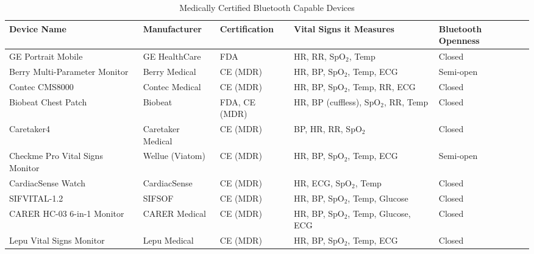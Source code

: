 \begin{table}[H]
\centering
\caption{Medically Certified Bluetooth Capable Devices}
	\renewcommand{\arraystretch}{1.2}
	\begin{tabularx}{\textwidth}{|>{\RaggedRight\arraybackslash}X|>{\RaggedRight\arraybackslash}X|>{\RaggedRight\arraybackslash}X|>{\RaggedRight\arraybackslash}X|>{\RaggedRight\arraybackslash}X|}
	\hline
	\textbf{Device Name} & \textbf{Manufacturer} & \textbf{Certification} & \textbf{Vital Signs it Measures} & \textbf{Bluetooth Openness} \\
	\hline
	GE Portrait Mobile & GE HealthCare & FDA & HR, RR, SpO$_2$, Temp & Closed \\ 
	\hline
	Berry Multi-Parameter Monitor & Berry Medical & CE (MDR) & HR, BP, SpO$_2$, Temp, ECG & Semi-open \\
	\hline
		Contec CMS8000 & Contec Medical & CE (MDR) & HR, BP, SpO$_2$, Temp, RR, ECG & Closed \\
		\hline
		Biobeat Chest Patch & Biobeat & FDA, CE (MDR) & HR, BP (cuffless), SpO$_2$, RR, Temp & Closed \\
		\hline
		Caretaker4 & Caretaker Medical & CE (MDR) & BP, HR, RR, SpO$_2$ & Closed \\
		\hline
		Checkme Pro Vital Signs Monitor & Wellue (Viatom) & CE (MDR) & HR, BP, SpO$_2$, Temp, ECG & Semi-open \\
		\hline
		CardiacSense Watch & CardiacSense & CE (MDR) & HR, ECG, SpO$_2$, Temp & Closed \\
		\hline
		SIFVITAL-1.2 & SIFSOF & CE (MDR) & HR, BP, SpO$_2$, Temp, Glucose & Closed \\
		\hline
		CARER HC-03 6-in-1 Monitor & CARER Medical & CE (MDR) & HR, BP, SpO$_2$, Temp, Glucose, ECG & Closed \\
		\hline
		Lepu Vital Signs Monitor & Lepu Medical & CE (MDR) & HR, BP, SpO$_2$, Temp, ECG & Closed \\
		\hline
	\end{tabularx}
	\renewcommand{\arraystretch}{1.0}
\label{tab:lpwan_adv_disadv}
\end{table}

